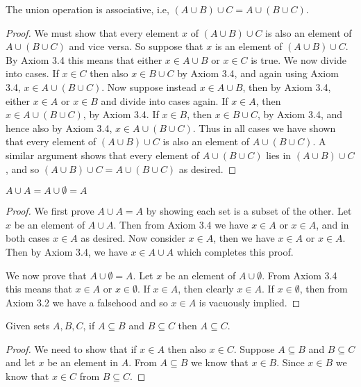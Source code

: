 \documentclass[12pt]{article}
\newenvironment{lemma}[2][Lemma]{\begin{trivlist}
\item[\hskip \labelsep {\bfseries #1}\hskip \labelsep {\bfseries #2}]}{\end{trivlist}}
\newenvironment{proposition}[2][Proposition]{\begin{trivlist}
\item[\hskip \labelsep {\bfseries #1}\hskip \labelsep {\bfseries #2}]}{\end{trivlist}}
\begin{document}
\begin{lemma}{3.1.13c}
	The union operation is associative, i.e, $ (A \cup B) \cup C = A \cup (B \cup C) $.
\end{lemma}
\begin{proof}
	We must show that every element $ x $ of $ (A \cup B) \cup C $ is also an element of $ A \cup (B \cup C) $ and vice versa.
	So suppose that $ x $ is an element of $ (A \cup B) \cup C $.
	By Axiom 3.4 this means that either $ x \in A \cup B $ or $ x \in C $ is true.
	We now divide into cases.
	If $ x \in C $ then also $ x \in B \cup C $ by Axiom 3.4, and again using Axiom 3.4, $ x \in A \cup (B \cup C) $.
	Now suppose instead $ x \in A \cup B $, then by Axiom 3.4, either $ x \in A $ or $ x \in B $ and divide into cases again.
	If $ x \in A $, then $ x \in A \cup (B \cup C) $, by Axiom 3.4.
	If $ x \in B $, then $ x \in B \cup C $, by Axiom 3.4, and hence also by Axiom 3.4, $ x \in A \cup (B \cup C) $.
	Thus in all cases we have shown that every element of $ (A \cup B) \cup C $ is also an element of $ A \cup (B \cup C) $.
	A similar argument shows that every element of $ A \cup (B \cup C) $ lies in $ (A \cup B) \cup C $, and so $ (A \cup B) \cup C = A \cup (B \cup C) $ as desired.
\end{proof}

\begin{lemma}{3.1.13d}
	$ A \cup A = A \cup \emptyset = A $
\end{lemma}
\begin{proof}
	We first prove $ A \cup A = A $ by showing each set is a subset of the other.
	Let $ x $ be an element of $ A \cup A $.
	Then from Axiom 3.4 we have $ x \in A $ or $ x \in A $, and in both cases $ x \in A $ as desired.
	Now consider $ x \in A $, then we have $ x \in A $ or $ x \in A $.
	Then by Axiom 3.4, we have $ x \in A \cup A $ which completes this proof.
	
	We now prove that $ A \cup \emptyset = A $.
	Let $ x $ be an element of $ A \cup \emptyset $.
	From Axiom 3.4 this means that $ x \in A $ or $ x \in \emptyset $.
	If $ x \in A $, then clearly $ x \in A $.
	If $ x \in \emptyset $, then from Axiom 3.2 we have a falsehood and so $ x \in A $ is vacuously implied.
\end{proof}

\begin{proposition}{3.1.18a}
	Given sets $ A, B, C $, if $ A \subseteq B $ and $ B \subseteq C $ then $ A \subseteq C $.
\end{proposition}
\begin{proof}
	We need to show that if $ x \in A $ then also $ x \in C $.
	Suppose $ A \subseteq B $ and $ B \subseteq C $ and let $ x $ be an element in $ A $.
	From $ A \subseteq B $ we know that $ x \in B $.
	Since $ x \in B $ we know that $ x \in C $ from $ B \subseteq C $.
\end{proof}
\end{document}
